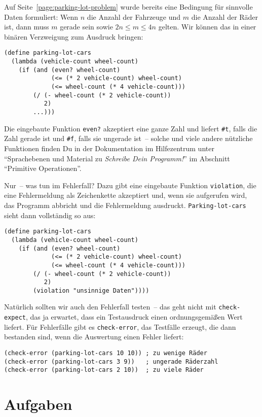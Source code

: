 Auf Seite~\ref{page:parking-lot-problem} wurde bereits eine Bedingung
für sinnvolle Daten formuliert: Wenn $n$ die Anzahl der Fahrzeuge und
$m$ die Anzahl der Räder ist, dann muss $m$ gerade sein sowie $2n\leq
m\leq 4n$ gelten.  Wir können das in einer binären Verzweigung zum
Ausdruck bringen:
%
\begin{verbatim}
(define parking-lot-cars
  (lambda (vehicle-count wheel-count)
    (if (and (even? wheel-count)
             (<= (* 2 vehicle-count) wheel-count)
             (<= wheel-count (* 4 vehicle-count)))
        (/ (- wheel-count (* 2 vehicle-count))
           2)
        ...)))
\end{verbatim}
%
Die eingebaute Funktion \texttt{even?} akzeptiert eine ganze Zahl und
liefert \verb|#t|, falls die Zahl gerade ist und \verb|#f|, falls sie
ungerade ist~-- solche und viele andere nützliche Funktionen finden
Du in der Dokumentation im Hilfezentrum unter "`Sprachebenen und
Material zu \textit{Schreibe Dein Programm!}"' im Abschnitt
"`Primitive Operationen"'.

Nur~-- was tun im Fehlerfall?  Dazu gibt eine eingebaute Funktion
\texttt{violation}, die eine Fehlermeldung als Zeichenkette akzeptiert
und, wenn sie aufgerufen wird, das Programm abbricht und die
Fehlermeldung ausdruckt.  \texttt{Parking-lot-cars} sieht dann
vollständig so aus:
%
\begin{verbatim}
(define parking-lot-cars
  (lambda (vehicle-count wheel-count)
    (if (and (even? wheel-count)
             (<= (* 2 vehicle-count) wheel-count)
             (<= wheel-count (* 4 vehicle-count)))
        (/ (- wheel-count (* 2 vehicle-count))
           2)
        (violation "unsinnige Daten"))))
\end{verbatim}
%
Natürlich sollten wir auch den Fehlerfall testen~-- das geht nicht mit
\texttt{check-expect}, das ja erwartet, dass ein Testausdruck einen
ordnungsgemäßen Wert liefert.  Für Fehlerfälle gibt es
\texttt{check-error}, das Testfälle erzeugt, die dann bestanden sind,
wenn die Auswertung einen Fehler liefert:
%
\begin{verbatim}
(check-error (parking-lot-cars 10 10)) ; zu wenige Räder
(check-error (parking-lot-cars 3 9))   ; ungerade Räderzahl
(check-error (parking-lot-cars 2 10))  ; zu viele Räder
\end{verbatim}

\section*{Aufgaben}

